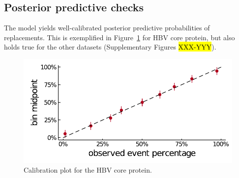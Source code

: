 \documentclass{bioinfo}
\begin{document}
\subsection{Posterior predictive checks}
The model yields well-calibrated posterior predictive probabilities of replacements. This is exemplified in Figure~\ref{fig:calibration} for HBV core protein, but also holds true for the other datasets (Supplementary Figures \hl{XXX-YYY}).

\begin{figure}[!ht]
 \includegraphics[width=1.0\linewidth]{plots/phylogeny_calibration.pdf}  
  \caption{Calibration plot for the HBV core protein.}
  \label{fig:calibration}
\end{figure}


\end{document}
